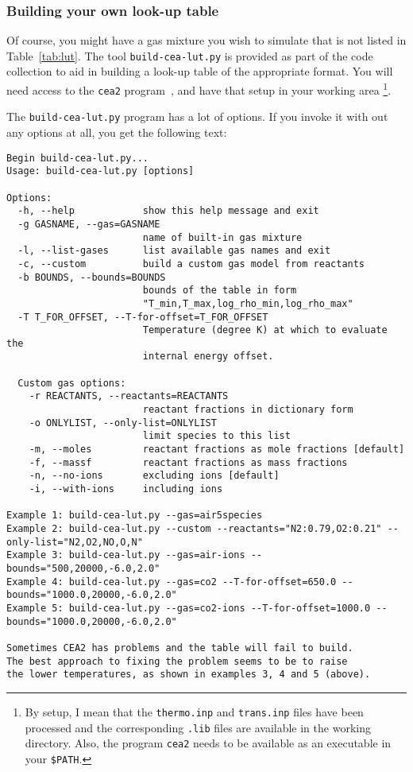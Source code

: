 \subsubsection{Building your own look-up table}
Of course, you might have a gas mixture you wish to simulate that is not listed in Table~\ref{tab:lut}.
The tool \texttt{build-cea-lut.py} is provided as part of the code collection to aid in building a 
look-up table of the appropriate format.
You will need access to the \texttt{cea2} program~\cite{gordon_mcbride_1994, mcbride_gordon_1996}, and have that setup in your working area
\footnote{By setup, I mean
that the \texttt{thermo.inp} and \texttt{trans.inp} files have been processed and the corresponding \texttt{.lib} files
are available in the working directory.
Also, the program \texttt{cea2} needs to be available as an executable in your \texttt{\$PATH}.}.

\medskip
The \texttt{build-cea-lut.py} program has a lot of options.
If you invoke it with out any options at all, you get the following text:
{\footnotesize
\begin{verbatim}
Begin build-cea-lut.py...
Usage: build-cea-lut.py [options]

Options:
  -h, --help            show this help message and exit
  -g GASNAME, --gas=GASNAME
                        name of built-in gas mixture
  -l, --list-gases      list available gas names and exit
  -c, --custom          build a custom gas model from reactants
  -b BOUNDS, --bounds=BOUNDS
                        bounds of the table in form
                        "T_min,T_max,log_rho_min,log_rho_max"
  -T T_FOR_OFFSET, --T-for-offset=T_FOR_OFFSET
                        Temperature (degree K) at which to evaluate the
                        internal energy offset.

  Custom gas options:
    -r REACTANTS, --reactants=REACTANTS
                        reactant fractions in dictionary form
    -o ONLYLIST, --only-list=ONLYLIST
                        limit species to this list
    -m, --moles         reactant fractions as mole fractions [default]
    -f, --massf         reactant fractions as mass fractions
    -n, --no-ions       excluding ions [default]
    -i, --with-ions     including ions

Example 1: build-cea-lut.py --gas=air5species
Example 2: build-cea-lut.py --custom --reactants="N2:0.79,O2:0.21" --only-list="N2,O2,NO,O,N"
Example 3: build-cea-lut.py --gas=air-ions --bounds="500,20000,-6.0,2.0"
Example 4: build-cea-lut.py --gas=co2 --T-for-offset=650.0 --bounds="1000.0,20000,-6.0,2.0"
Example 5: build-cea-lut.py --gas=co2-ions --T-for-offset=1000.0 --bounds="1000.0,20000,-6.0,2.0"

Sometimes CEA2 has problems and the table will fail to build.
The best approach to fixing the problem seems to be to raise
the lower temperatures, as shown in examples 3, 4 and 5 (above).
\end{verbatim}
} %


